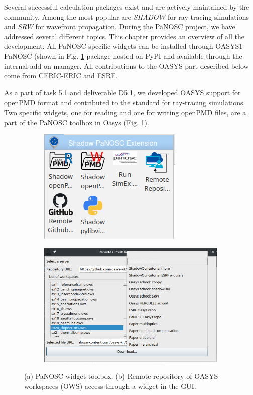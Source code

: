 \documentclass[11pt, a4paper]{article}
\begin{document}
Several successful calculation packages exist and are actively maintained by the community. Among the most popular are \emph{SHADOW} for ray-tracing simulations and \emph{SRW} for wavefront propagation. During the PaNOSC project, we have addressed several different topics. This chapter provides an overview of all the development. All PaNOSC-specific widgets can be installed through OASYS1-PaNOSC (shown in Fig. \ref{fig:toolbox} package hosted on PyPI and available through the internal add-on manager. All contributions to the OASYS part described below come from CERIC-ERIC and ESRF.

As a part of task 5.1 and deliverable D5.1, we developed OASYS support for
openPMD format and contributed to the standard for ray-tracing simulations. Two
specific widgets, one for reading and one for writing openPMD files, are a part
of the PaNOSC toolbox in Oasys (Fig. \ref{fig:toolbox}).


\begin{figure}[htb]
    \centering
    \begin{subfigure}{0.3\textwidth}
        \includegraphics{figures/panosc_toolbox.png}
        \caption{}
        \label{fig:toolbox}
    \end{subfigure}
    \hfil
    \begin{subfigure}{0.5\textwidth}
        \includegraphics{figures/github_remote_access.png}
        \caption{}
        \label{fig:github_access}
    \end{subfigure}%
    \caption{(a) PaNOSC widget toolbox. (b) Remote repository of OASYS workspaces (OWS) access through a widget in the GUI.}
\end{figure}
\end{document}
